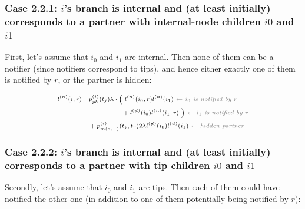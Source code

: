 \documentclass[a4paper,10pt]{article}
\begin{document}
\subsubsection*{Case 2.2.1: $i$'s branch is internal and (at least initially) corresponds to a partner with internal-node children $i0$ and $i1$} 

First, let's assume that $i_0$ and $i_1$ are internal. Then none of them can be a notifier (since notifiers correspond to tips), and hence either exactly one of them is notified by $r$, or the partner is hidden:

\begin{equation}
\scriptsize
\begin{split}
l^{(n)}(i, r) = &p_{pb}^{(i)}(t_j) \lambda \cdot
\Big(~l^{(n)}(i_0,r)l^{(\not{n})}(i_1) \textit{\color{gray}~$\leftarrow$ $i_0$ is notified by $r$} \\
& ~~~~~~~~~~~~~~~+ l^{(\not{n})}(i_0)l^{(n)}(i_1,r)~\Big) \textit{\color{gray}~$\leftarrow$ $i_1$ is notified by $r$} \\
& + p_{m(o,-)}^{(i)}(t_j,t_r) 2 \lambda l^{(\not{n})}(i_0)l^{(\not{n})}(i_1) \textit{\color{gray}~$\leftarrow$ hidden partner}\\
 \end{split}
\label{eq:lp-int-int}
\end{equation}

\subsubsection*{Case 2.2.2: $i$'s branch is internal and (at least initially) corresponds to a partner with tip children $i0$ and $i1$} 
Secondly, let's assume that $i_0$ and $i_1$ are tips. Then each of them could have notified the other one (in addition to one of them potentially being notified by $r$):
\end{document}
